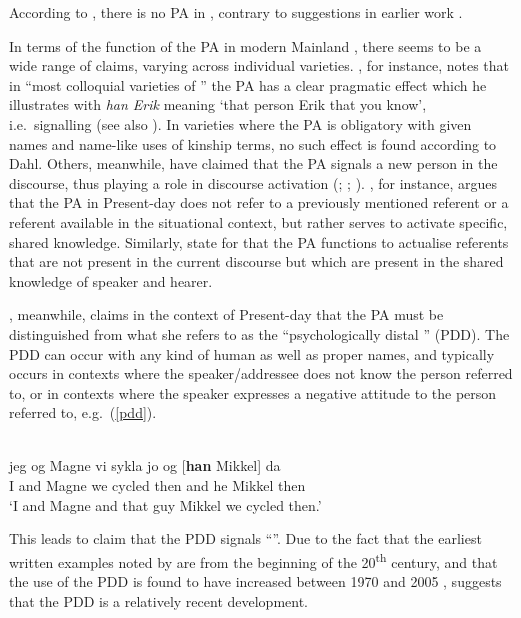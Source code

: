 \documentclass[output=paper,colorlinks,citecolor=brown]{langscibook}
\begin{document}
According to \citet{jorgensen2000studien}, there is no PA in , contrary to suggestions in earlier work \citep{hulthen1944studier}.


In terms of the function of the PA in modern Mainland , there seems to be a wide range of claims, varying across individual varieties. \citet[97]{dahl2015grammaticalization}, for instance, notes that in ``most colloquial varieties of '' the PA has a clear pragmatic effect which he illustrates with \textit{han Erik} meaning `that person Erik that you know', i.e.~signalling  (see also \citealp{delsing2003syntaktisk}). In varieties where the PA is obligatory with given names and name-like uses of kinship terms, no such effect is found according to Dahl. Others, meanwhile, have claimed that the PA signals a new person in the discourse, thus playing a role in discourse activation (\citealp{Teleman1999}; \citealp{Strahan2007}; \citealp{Lie2008,lie2010om}). \citet{lie2010om}, for instance, argues that the PA in Present-day  does not refer to a previously mentioned referent or a referent available in the situational context, but rather serves to activate specific, shared knowledge. Similarly, \citet{Teleman1999} state for  that the PA functions to actualise referents that are not present in the current discourse but which are present in the shared knowledge of speaker and hearer. 

\citet{Johannessen2008,johannessen2020psychologically}, meanwhile, claims in the context of Present-day  that the PA must be distinguished from what she refers to as the ``psychologically distal '' (PDD). The PDD can occur with any kind of human  as well as proper names, and typically occurs in contexts where the speaker/addressee does not know the person referred to, or in contexts where the speaker expresses a negative attitude to the person referred to, e.g.~(\ref{pdd}).

\ea \label{pdd}   \\
\gll jeg og Magne vi sykla jo og [\textbf{han} Mikkel] da\\
I and Magne we cycled then and he Mikkel then\\
\glt `I and Magne and that guy Mikkel we cycled then.'\\
\citep[164]{Johannessen2008}
\z

This leads \citet{Johannessen2008,johannessen2020psychologically} to claim that the PDD signals ``''.  Due to the fact that the earliest written examples noted by \citet{Johannessen2008} are from the beginning of the 20\textsuperscript{th} century, and that the use of the PDD is found to have increased between 1970 and 2005 \citep{Johannessen2008}, \citet{kinn2017null} suggests that the PDD is a relatively recent development.
\end{document}
